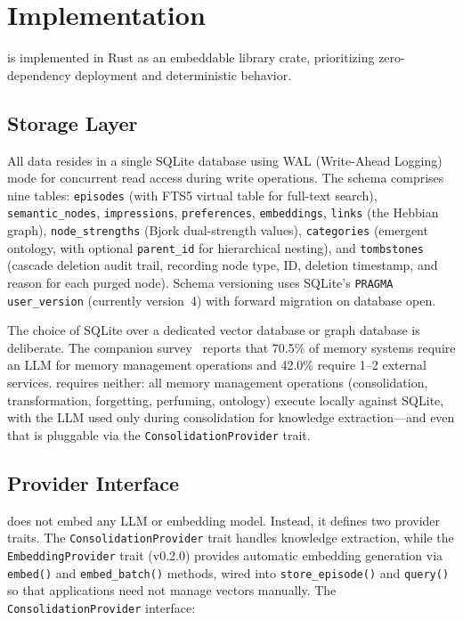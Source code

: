 \section{Implementation}
\label{sec:implementation}

\alaya{} is implemented in Rust as an embeddable library crate, prioritizing
zero-dependency deployment and deterministic behavior.

\subsection{Storage Layer}

All data resides in a single SQLite database using WAL (Write-Ahead Logging)
mode for concurrent read access during write operations. The schema comprises
nine tables: \texttt{episodes} (with FTS5 virtual table for full-text
search), \texttt{semantic\_nodes}, \texttt{impressions},
\texttt{preferences}, \texttt{embeddings}, \texttt{links} (the Hebbian
graph), \texttt{node\_strengths} (Bjork dual-strength values),
\texttt{categories} (emergent ontology, with optional \texttt{parent\_id}
for hierarchical nesting), and \texttt{tombstones} (cascade deletion audit
trail, recording node type, ID, deletion timestamp, and reason for each
purged node). Schema versioning uses SQLite's
\texttt{PRAGMA user\_version} (currently version~4) with forward migration
on database open.

The choice of SQLite over a dedicated vector database or graph database is
deliberate. The companion survey~\cite{hui2026taxonomy} reports that 70.5\%
of memory systems require an LLM for memory management operations and 42.0\%
require 1--2 external services. \alaya{} requires neither: all memory
management operations (consolidation, transformation, forgetting,
perfuming, ontology) execute locally against SQLite, with the LLM used only
during consolidation for knowledge extraction---and even that is pluggable
via the \texttt{ConsolidationProvider} trait.

\subsection{Provider Interface}

\alaya{} does not embed any LLM or embedding model. Instead, it defines two
provider traits. The \texttt{ConsolidationProvider} trait handles knowledge
extraction, while the \texttt{EmbeddingProvider} trait (v0.2.0) provides
automatic embedding generation via \texttt{embed()} and
\texttt{embed\_batch()} methods, wired into \texttt{store\_episode()} and
\texttt{query()} so that applications need not manage vectors manually.
The \texttt{ConsolidationProvider} interface:

